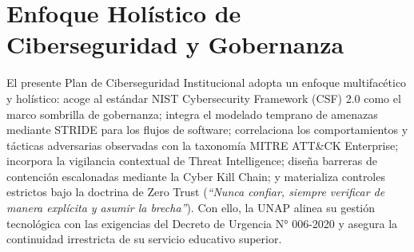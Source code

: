 \section{Enfoque Holístico de Ciberseguridad y Gobernanza}

El presente Plan de Ciberseguridad Institucional adopta un enfoque multifacético y holístico: acoge al estándar NIST Cybersecurity Framework (CSF) 2.0 como el marco sombrilla de gobernanza; integra el modelado temprano de amenazas mediante STRIDE para los flujos de software; correlaciona los comportamientos y tácticas adversarias observadas con la taxonomía MITRE ATT\&CK Enterprise; incorpora la vigilancia contextual de Threat Intelligence; diseña barreras de contención escalonadas mediante la Cyber Kill Chain; y materializa controles estrictos bajo la doctrina de Zero Trust (\textit{``Nunca confiar, siempre verificar de manera explícita y asumir la brecha''}). Con ello, la UNAP alinea su gestión tecnológica con las exigencias del Decreto de Urgencia N° 006-2020 y asegura la continuidad irrestricta de su servicio educativo superior.
